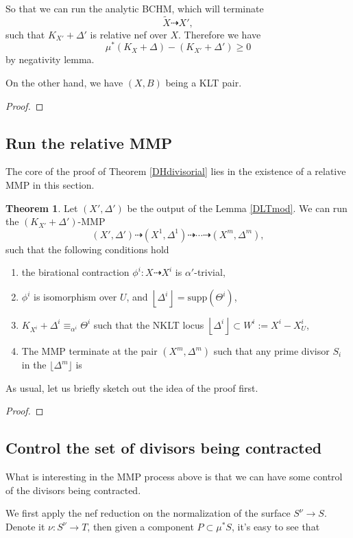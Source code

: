 \documentclass[11pt]{article}
\theoremstyle{definition}
\newtheorem{theorem}{Theorem}
\begin{document}
	So that we can run the analytic BCHM, which will terminate $$\widetilde{X}\dashrightarrow X',$$ such that $K_{X'} + \Delta '$ is relative nef over $X$. Therefore we have $$\mu^* (K_X+\Delta )- (K_{X'}+\Delta ')\ge 0$$by negativity lemma. 
	
	On the other hand, we have $(X,B)$ being a KLT pair.
	\begin{proof}
		
	\end{proof}
	\subsection{Run the relative MMP}
	The core of the proof of Theorem \ref{DHdivisorial} lies in the existence of a relative MMP in this section.
	
	\begin{theorem}
		Let $(X',\Delta')$ be the output of the Lemma \ref{DLTmod}. We can run the $(K_{X'}+\Delta')$-MMP $$(X',\Delta') \dashrightarrow (X^{1},\Delta^{1})\dashrightarrow  \cdots  \dashrightarrow (X^m ,\Delta^m),$$ such that the following conditions hold
		\begin{enumerate}
			\item the birational contraction $\phi^i:X \dashrightarrow X^{i}$ is $\alpha'$-trivial,
			\item $\phi^i$ is isomorphism over $U$, and $\left\lfloor\Delta^i\right\rfloor = \text{supp}(\Theta^i)$,
			\item $K_{X^{i}}+ \Delta^{i}\equiv_{\alpha^i}\Theta^i$ such that the NKLT locus $\left\lfloor\Delta^i\right\rfloor \subset W^i:= X^i - X^i_U$, 
			\item The MMP terminate at the pair $(X^m,\Delta^m)$ such that any prime divisor $S_i$ in the $\lfloor{\Delta^m}\rfloor$ is 
		\end{enumerate}
	\end{theorem}
	As usual, let us briefly sketch out the idea of the proof first. 
	\begin{proof}
		
	\end{proof}
	\subsection{Control the set of divisors being contracted}
	What is interesting in the MMP process above is that we can have some control of the divisors being contracted. 
	
	We first apply the nef reduction on the normalization of the surface $S^\nu \to S$. Denote it $\nu: S^\nu \to T$, then given a component $P \subset \mu^* S$, it's easy to see that 
	
\end{document}
